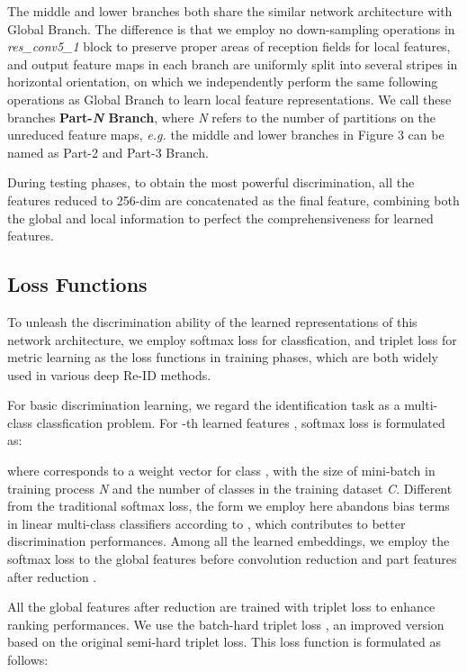 \documentclass[sigconf]{acmart}
\begin{document}
The middle and lower branches both share the similar network architecture with Global Branch. The difference is that we employ no down-sampling operations in \textit{res\_conv5\_1} block to preserve proper areas of reception fields for local features, and output feature maps in each branch are uniformly split into several stripes in horizontal orientation, on which we independently perform the same following operations as Global Branch to learn local feature representations. We call these branches \textbf{Part-\textit{N} Branch}, where \textit{N} refers to the number of partitions on the unreduced feature maps, \textit{e.g.} the middle and lower branches in Figure 3 can be named as Part-2 and Part-3 Branch. 

During testing phases, to obtain the most powerful discrimination, all the features reduced to 256-dim are concatenated as the final feature, combining both the global and local information to perfect the comprehensiveness for learned features. 



\subsection{Loss Functions}
To unleash the discrimination ability of the learned representations of this network architecture, we employ softmax loss for classfication, and triplet loss for metric learning as the loss functions in training phases, which are both widely used in various deep Re-ID methods. 

For basic discrimination learning, we regard the identification task as a multi-class classfication problem. For -th learned features , softmax loss is formulated as:


where  corresponds to a weight vector for class , with the size of mini-batch in training process \textit{N} and the number of classes in the training dataset \textit{C}. Different from the traditional softmax loss, the form we employ here abandons bias terms in linear multi-class classifiers according to \cite{wang2017normface}, which contributes to better discrimination performances. Among all the learned embeddings, we employ the softmax loss to the global features before  convolution reduction  and part features after reduction .

All the global features after reduction  are trained with triplet loss to enhance ranking performances. We use the batch-hard triplet loss \cite{hermans2017defense}, an improved version based on the original semi-hard triplet loss. This loss function is formulated as follows:
\end{document}
